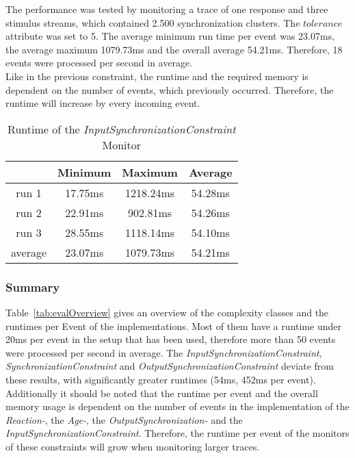 	The performance was tested by monitoring a trace of one response and three stimulus streams, which contained 2.500 synchronization clusters. The $tolerance$ attribute was set to 5. The average minimum run time per event was 23.07ms, the average maximum 1079.73ms and the overall average 54.21ms. Therefore, 18 events were processed per second in average.\\
	Like in the previous constraint, the runtime and the required memory is dependent on the number of events, which previously occurred. Therefore, the runtime will increase by every incoming event.
	\begin{table}
		\begin{tabular}{|c|c|c|c|}
			\hline
					& Minimum & Maximum & Average \\
			\hline
			run 1	& 17.75ms & 1218.24ms & 54.28ms \\
			\hline
			run 2	& 22.91ms & 902.81ms & 54.26ms\\
			\hline
			run 3	& 28.55ms & 1118.14ms & 54.10ms\\
			\hline
			average & 23.07ms & 1079.73ms & 54.21ms\\
			\hline
		\end{tabular}
		\centering
		\label{tab:runtimeInputSynchronizationConstraint}
		\caption{Runtime of the \emph{InputSynchronizationConstraint} Monitor}
	\end{table}

\subsubsection{Summary}
	Table~\ref{tab:evalOverview} gives an overview of the complexity classes and the runtimes per Event of the implementations. Most of them have a runtime under 20ms per event in the setup that has been used, therefore more than 50 events were processed per second in average.
	The \emph{InputSynchronizationConstraint}, \emph{SynchronizationConstraint} and \emph{OutputSynchronizationConstraint} deviate from these results, with significantly greater runtimes (54ms, 452ms %
	per event). Additionally it should be noted that the runtime per event and the overall memory usage is dependent on the number of events in the implementation of the \emph{Reaction-}, the \emph{Age-}, the \emph{OutputSynchronization-} and the \emph{InputSynchronizationConstraint}. Therefore, the runtime per event of the monitors of these constraints will grow when monitoring larger traces.

